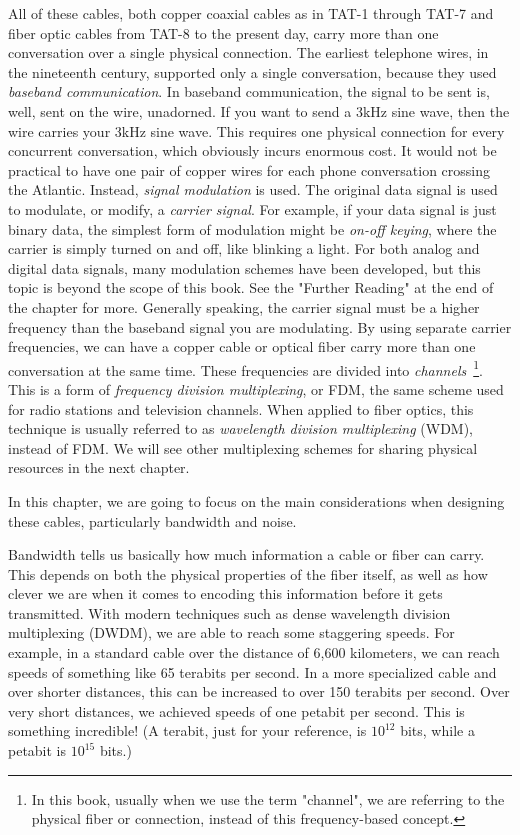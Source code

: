 All of these cables, both copper coaxial cables as in TAT-1 through TAT-7 and fiber optic cables from TAT-8 to the present day, carry more than one conversation over a single physical connection.  The earliest telephone wires, in the nineteenth century, supported only a single conversation, because they used \emph{baseband communication}. In baseband communication, the signal to be sent is, well, sent on the wire, unadorned.  If you want to send a 3kHz sine wave, then the wire carries your 3kHz sine wave. This requires one physical connection for every concurrent conversation, which obviously incurs enormous cost.  It would not be practical to have one pair of copper wires for each phone conversation crossing the Atlantic.  Instead, \emph{signal modulation} is used.  The original data signal is used to modulate, or modify, a \emph{carrier signal}. For example, if your data signal is just binary data, the simplest form of modulation might be \emph{on-off keying}, where the carrier is simply turned on and off, like blinking a light. For both analog and digital data signals, many modulation schemes have been developed, but this topic is beyond the scope of this book. See the "Further Reading" at the end of the chapter for more.  Generally speaking, the carrier signal must be a higher frequency than the baseband signal you are modulating. By using separate carrier frequencies, we can have a copper cable or optical fiber carry more than one conversation at the same time. These frequencies are divided into \emph{channels}~\footnote{In this book, usually when we use the term "channel", we are referring to the physical fiber or connection, instead of this frequency-based concept.}.  This is a form of \emph{frequency division multiplexing}, or FDM, the same scheme used for radio stations and television channels. When applied to fiber optics, this technique is usually referred to as \emph{wavelength division multiplexing} (WDM), instead of FDM.  We will see other multiplexing schemes for sharing physical resources in the next chapter.

In this chapter, we are going to focus on the main considerations when designing these cables, particularly bandwidth and noise.

Bandwidth tells us basically how much information a cable or fiber can carry.
This depends on both the physical properties of the fiber itself, as well as how clever we are when it comes to encoding this information before it gets transmitted. With modern techniques such as dense wavelength division multiplexing (DWDM), we are able to reach some staggering speeds. For example, in a standard cable over the distance of 6,600 kilometers, we can reach speeds of something like 65 terabits per second. In a more specialized cable and over shorter distances, this can be increased to over 150 terabits per second. Over very short distances, we achieved speeds of one petabit per second. This is something incredible! (A terabit, just for your reference, is $10^{12}$ bits, while a petabit is $10^{15}$ bits.)

